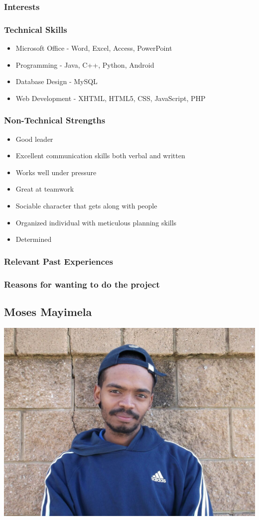 \documentclass[a4paper,12pt]{article}
\begin{document}
\subsubsection{Interests}
\subsubsection{Technical Skills}
\begin{itemize}
\item Microsoft Office - Word, Excel, Access, PowerPoint
\item Programming - Java, C++, Python, Android
\item Database Design - MySQL
\item Web Development - XHTML, HTML5, CSS, JavaScript, PHP
\end{itemize}
\subsubsection{Non-Technical Strengths}
\begin{itemize}
\item Good leader
\item Excellent communication skills both verbal and written
\item Works well under pressure
\item Great at teamwork
\item Sociable character that gets along with people
\item Organized individual with meticulous planning skills
\item Determined
\end{itemize}
\subsubsection{Relevant Past Experiences}
\subsubsection{Reasons for wanting to do the project}
\newpage
\subsection{Moses Mayimela}
\includegraphics[width=\textwidth]{images/Moses}
\end{document}
